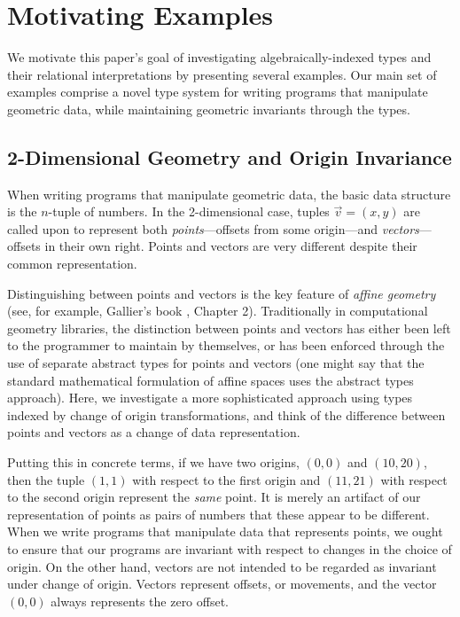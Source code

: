 \section{Motivating Examples}
\label{sec:motivating-examples}

We motivate this paper's goal of investigating algebraically-indexed
types and their relational interpretations by presenting several
examples. Our main set of examples comprise a novel type system for
writing programs that manipulate geometric data, while maintaining
geometric invariants through the types. 

\subsection{2-Dimensional Geometry and Origin Invariance}

When writing programs that manipulate geometric data, the basic data
structure is the $n$-tuple of numbers. In the 2-dimensional case,
tuples $\vec{v} = (x,y)$ are called upon to represent both
\emph{points}---offsets from some origin---and
\emph{vectors}---offsets in their own right. Points and vectors are
very different despite their common representation.

Distinguishing between points and vectors is the key feature of
\emph{affine geometry} (see, for example, Gallier's book
\cite{gallier11geometric}, Chapter 2). Traditionally in computational
geometry libraries, the distinction between points and vectors has
either been left to the programmer to maintain by themselves, or has
been enforced through the use of separate abstract types for points
and vectors (one might say that the standard mathematical formulation
of affine spaces uses the abstract types approach). Here, we
investigate a more sophisticated approach using types indexed by
change of origin transformations, and think of the difference between
points and vectors as a change of data representation.

Putting this in concrete terms, if we have two origins, $(0,0)$ and
$(10,20)$, then the tuple $(1,1)$ with respect to the first origin and
$(11,21)$ with respect to the second origin represent the \emph{same}
point. It is merely an artifact of our representation of points as
pairs of numbers that these appear to be different. When we write
programs that manipulate data that represents points, we ought to
ensure that our programs are invariant with respect to changes in the
choice of origin. On the other hand, vectors are not intended to be
regarded as invariant under change of origin. Vectors represent
offsets, or movements, and the vector $(0,0)$ always represents the
zero offset.

